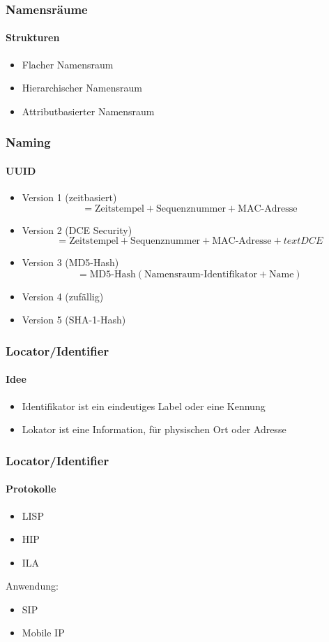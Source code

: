 \begin{frame}
  \frametitle{Namensräume}
  \framesubtitle{Strukturen}
  \begin{itemize}
    \item Flacher Namensraum
    \item Hierarchischer Namensraum
    \item Attributbasierter Namensraum
  \end{itemize}
\end{frame}

\begin{frame}
  \frametitle{Naming}
  \framesubtitle{UUID}
  \begin{itemize}
    \item Version 1 (zeitbasiert)
    \begin{equation}
       = \text{Zeitstempel} + \text{Sequenznummer} + \text{MAC-Adresse}
    \end{equation}
    \item Version 2 (DCE Security)
         \begin{equation}
       = \text{Zeitstempel} + \text{Sequenznummer} + \text{MAC-Adresse} + text{DCE}
    \end{equation}
    \item Version 3 (MD5-Hash)
        \begin{equation}
        = \text{MD5-Hash}(\text{Namensraum-Identifikator} + \text{Name})
    \end{equation}
    \item Version 4 (zufällig)
    \item Version 5 (SHA-1-Hash)
  \end{itemize}
\end{frame}

\begin{frame}
  \frametitle{Locator/Identifier}
  \framesubtitle{Idee}
  \begin{itemize}
    \item Identifikator ist ein eindeutiges Label oder eine Kennung
    \item Lokator ist eine Information, für physischen Ort oder Adresse 
  \end{itemize}
\end{frame}

\begin{frame}
  \frametitle{Locator/Identifier}
  \framesubtitle{Protokolle}
  \begin{itemize}
    \item LISP
    \item HIP
    \item ILA
  \end{itemize}
  Anwendung:
  \begin{itemize}
    \item SIP
    \item Mobile IP
  \end{itemize}
\end{frame}
